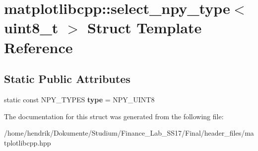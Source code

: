 \hypertarget{structmatplotlibcpp_1_1select__npy__type_3_01uint8__t_01_4}{}\section{matplotlibcpp\+:\+:select\+\_\+npy\+\_\+type$<$ uint8\+\_\+t $>$ Struct Template Reference}
\label{structmatplotlibcpp_1_1select__npy__type_3_01uint8__t_01_4}
\subsection*{Static Public Attributes}
\begin{DoxyCompactItemize}
\item 
static const N\+P\+Y\+\_\+\+T\+Y\+P\+ES {\bfseries type} = N\+P\+Y\+\_\+\+U\+I\+N\+T8\hypertarget{structmatplotlibcpp_1_1select__npy__type_3_01uint8__t_01_4_a6e80bfd252a69f14ff869c8b4fbb9e54}{}\label{structmatplotlibcpp_1_1select__npy__type_3_01uint8__t_01_4_a6e80bfd252a69f14ff869c8b4fbb9e54}

\end{DoxyCompactItemize}


The documentation for this struct was generated from the following file\+:\begin{DoxyCompactItemize}
\item 
/home/hendrik/\+Dokumente/\+Studium/\+Finance\+\_\+\+Lab\+\_\+\+S\+S17/\+Final/header\+\_\+files/matplotlibcpp.\+hpp\end{DoxyCompactItemize}

